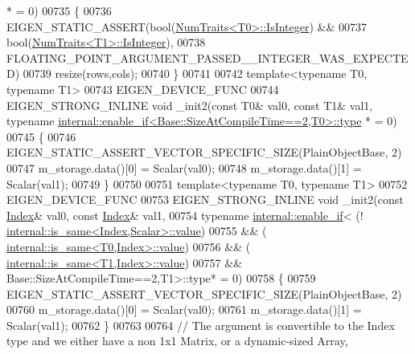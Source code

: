 \begin{DoxyCode}
      * = 0)
00735     \{
00736       EIGEN\_STATIC\_ASSERT(\textcolor{keywordtype}{bool}(\hyperlink{group___core___module_struct_eigen_1_1_num_traits}{NumTraits<T0>::IsInteger}) &&
00737                           \textcolor{keywordtype}{bool}(\hyperlink{group___core___module_struct_eigen_1_1_num_traits}{NumTraits<T1>::IsInteger}),
00738                           FLOATING\_POINT\_ARGUMENT\_PASSED\_\_INTEGER\_WAS\_EXPECTED)
00739       resize(rows,cols);
00740     \}
00741     
00742     \textcolor{keyword}{template}<\textcolor{keyword}{typename} T0, \textcolor{keyword}{typename} T1>
00743     EIGEN\_DEVICE\_FUNC 
00744     EIGEN\_STRONG\_INLINE \textcolor{keywordtype}{void} \_init2(\textcolor{keyword}{const} T0& val0, \textcolor{keyword}{const} T1& val1, \textcolor{keyword}{typename} 
      \hyperlink{struct_eigen_1_1internal_1_1enable__if}{internal::enable\_if<Base::SizeAtCompileTime==2,T0>::type}
      * = 0)
00745     \{
00746       EIGEN\_STATIC\_ASSERT\_VECTOR\_SPECIFIC\_SIZE(PlainObjectBase, 2)
00747       m\_storage.data()[0] = Scalar(val0);
00748       m\_storage.data()[1] = Scalar(val1);
00749     \}
00750     
00751     \textcolor{keyword}{template}<\textcolor{keyword}{typename} T0, \textcolor{keyword}{typename} T1>
00752     EIGEN\_DEVICE\_FUNC 
00753     EIGEN\_STRONG\_INLINE \textcolor{keywordtype}{void} \_init2(\textcolor{keyword}{const} \hyperlink{namespace_eigen_a62e77e0933482dafde8fe197d9a2cfde}{Index}& val0, \textcolor{keyword}{const} \hyperlink{namespace_eigen_a62e77e0933482dafde8fe197d9a2cfde}{Index}& val1,
00754                                     \textcolor{keyword}{typename} \hyperlink{struct_eigen_1_1internal_1_1enable__if}{internal::enable\_if}<    (!
      \hyperlink{struct_eigen_1_1internal_1_1is__same}{internal::is\_same<Index,Scalar>::value})
00755                                                                   && (
      \hyperlink{struct_eigen_1_1internal_1_1is__same}{internal::is\_same<T0,Index>::value})
00756                                                                   && (
      \hyperlink{struct_eigen_1_1internal_1_1is__same}{internal::is\_same<T1,Index>::value})
00757                                                                   && Base::SizeAtCompileTime==2,T1>::type* 
      = 0)
00758     \{
00759       EIGEN\_STATIC\_ASSERT\_VECTOR\_SPECIFIC\_SIZE(PlainObjectBase, 2)
00760       m\_storage.data()[0] = Scalar(val0);
00761       m\_storage.data()[1] = Scalar(val1);
00762     \}
00763 
00764     \textcolor{comment}{// The argument is convertible to the Index type and we either have a non 1x1 Matrix, or a
       dynamic-sized Array,}

\end{DoxyCode}
